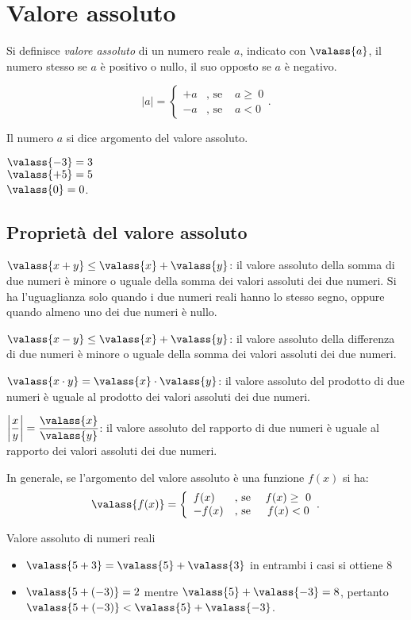 
\section{Valore assoluto}

Si definisce \emph{valore assoluto} di un numero reale \(a\), indicato con 
\(\valass{a}\), il numero stesso se 
\(a\) è positivo o nullo, il suo opposto se \(a\) è negativo.

\[
|a|=\left\{\begin{array}{lcc}
+a & \text{, se } & a\ge~0\\
-a & \text{, se } & a<0\end{array}.\right.
\]

Il numero \(a\) si dice argomento del valore assoluto.
\begin{htmulticols}{3}
\(\valass{-3}=3\)\\\(\valass{+5}=5\)\\\(\valass{0}=0\).
\end{htmulticols}
\subsection{Proprietà del valore assoluto}
\(\valass{x+y}\le \valass{x}+\valass{y}\): il valore assoluto della somma 
di due numeri è minore o uguale della somma dei valori assoluti dei due 
numeri. 
Si ha l'uguaglianza solo quando i due numeri reali hanno lo stesso segno, 
oppure quando almeno uno dei due numeri è nullo.

\(\valass{x-y}\le \valass{x}+\valass{y}\): il valore assoluto della 
differenza di due numeri è minore o uguale della somma dei valori assoluti 
dei due numeri.

\(\valass{x\cdot y}=\valass{x}\cdot \valass{y}\): il valore assoluto del 
prodotto di due numeri è uguale al prodotto dei valori assoluti dei due 
numeri.

\(\left |{\dfrac{x}{y}}\right|=\dfrac{\valass{x}}{\valass{y}}\): il valore 
assoluto del rapporto di due numeri è uguale al rapporto dei valori 
assoluti dei due numeri.

In generale, se l'argomento del valore assoluto è una funzione \(f(x)\) si 
ha:
\[
\valass{f(x)}=\left\{\begin{array}{lcc}
 f(x) & \text{, se } & f(x)\ge~0\\
-f(x) & \text{, se } & f(x)<0\end{array}.\right.
\]
\begin{esempio}{}{}
Valore assoluto di numeri reali
\begin{itemize}
\item \(\valass{5+3}=\valass{5}+\valass{3}\) in entrambi i casi si ottiene \(8\)
\item \(\valass{5+(-3)}=2\) mentre \(\valass{5}+\valass{-3}=8\), pertanto 
\(\valass{5+(-3)}<\valass{5}+\valass{-3}\).
\end{itemize}
\end{esempio}

